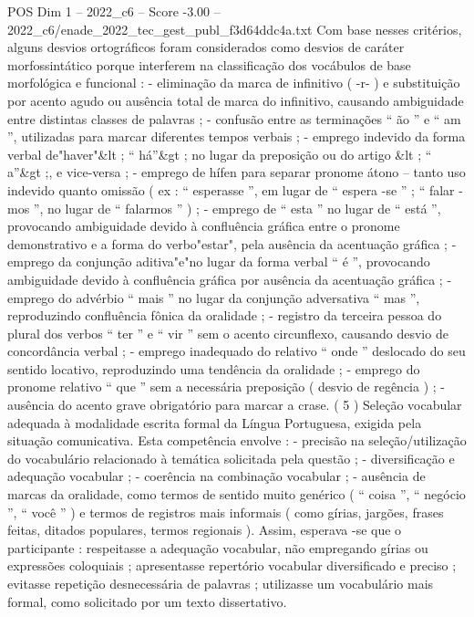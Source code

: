 \begin{textsample}{POS Dim 1 – 2022\_c6 – Score -3.00 – 2022\_c6/enade\_2022\_tec\_gest\_publ\_f3d64ddc4a.txt}
Com base nesses critérios, alguns desvios ortográficos foram considerados como desvios de caráter morfossintático porque interferem na classificação dos vocábulos de base morfológica e funcional : - eliminação da marca de infinitivo ( -r- ) e substituição por acento agudo ou ausência total de marca do infinitivo, causando ambiguidade entre distintas classes de palavras ; - confusão entre as terminações “ ão ” e “ am ”, utilizadas para marcar diferentes tempos verbais ; - emprego indevido da forma verbal de"haver"\&lt ; “ há”\&gt ; no lugar da preposição ou do artigo \&lt ; “ a”\&gt ;, e vice-versa ; - emprego de hífen para separar pronome átono – tanto uso indevido quanto omissão ( ex : “ esperasse ”, em lugar de “ espera -se ” ; “ falar -mos ”, no lugar de “ falarmos ” ) ; - emprego de “ esta ” no lugar de “ está ”, provocando ambiguidade devido à confluência gráfica entre o pronome demonstrativo e a forma do verbo"estar", pela ausência da acentuação gráfica ; - emprego da conjunção aditiva"e"no lugar da forma verbal “ é ”, provocando ambiguidade devido à confluência gráfica por ausência da acentuação gráfica ; - emprego do advérbio “ mais ” no lugar da conjunção adversativa “ mas ”, reproduzindo confluência fônica da oralidade ; - registro da terceira pessoa do plural dos verbos “ ter ” e “ vir ” sem o acento circunflexo, causando desvio de concordância verbal ; - emprego inadequado do relativo “ onde ” deslocado do seu sentido locativo, reproduzindo uma tendência da oralidade ; - emprego do pronome relativo “ que ” sem a necessária preposição ( desvio de regência ) ; - ausência do acento grave obrigatório para marcar a crase. ( 5 ) Seleção vocabular adequada à modalidade escrita formal da Língua Portuguesa, exigida pela situação comunicativa.
Esta competência envolve : - precisão na seleção/utilização do vocabulário relacionado à temática solicitada pela questão ; - diversificação e adequação vocabular ; - coerência na combinação vocabular ; - ausência de marcas da oralidade, como termos de sentido muito genérico ( “ coisa ”, “ negócio ”, “ você ” ) e termos de registros mais informais ( como gírias, jargões, frases feitas, ditados populares, termos regionais ).
Assim, esperava -se que o participante : respeitasse a adequação vocabular, não empregando gírias ou expressões coloquiais ; apresentasse repertório vocabular diversificado e preciso ; evitasse repetição desnecessária de palavras ; utilizasse um vocabulário mais formal, como solicitado por um texto dissertativo.

\end{textsample}
